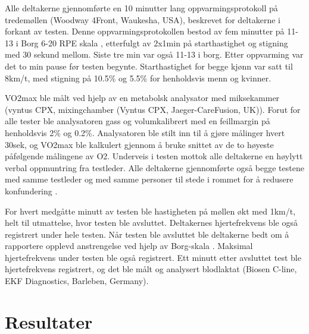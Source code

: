 \documentclass[
]{book}
\begin{document}
Alle deltakerne gjennomførte en 10 minutter lang oppvarmingsprotokoll på tredemøllen (Woodway 4Front, Waukesha, USA), beskrevet for deltakerne i forkant av testen. Denne oppvarmingsprotokollen bestod av fem minutter på 11-13 i Borg 6-20 RPE skala \citep{borg1982}, etterfulgt av 2x1min på starthastighet og stigning med 30 sekund mellom. Siste tre min var også 11-13 i borg. Etter oppvarming var det to min pause før testen begynte. Starthastighet for begge kjønn var satt til 8km/t, med stigning på 10.5\% og 5.5\% for henholdsvis menn og kvinner.

VO2max ble målt ved hjelp av en metabolsk analysator med miksekammer (vyntus CPX, mixing­chamber (Vyntus CPX, Jaeger-CareFusion, UK)). Forut for alle tester ble analysatoren gass og volumkalibrert med en feillmargin på henholdsvis 2\% og 0.2\%. Analysatoren ble stilt inn til å gjøre målinger hvert 30sek, og VO2max ble kalkulert gjennom å bruke snittet av de to høyeste påfølgende målingene av O2. Underveis i testen mottok alle deltakerne en høylytt verbal oppmuntring fra testleder. Alle deltakerne gjennomførte også begge testene med samme testleder og med samme personer til stede i rommet for å redusere konfundering \citep{halperin2015}.

For hvert medgåtte minutt av testen ble hastigheten på møllen økt med 1km/t, helt til utmattelse, hvor testen ble avsluttet. Deltakernes hjertefrekvens ble også registrert under hele testen. Når testen ble avsluttet ble deltakerne bedt om å rapportere opplevd anstrengelse ved hjelp av Borg-skala \citep{borg1982}. Maksimal hjertefrekvens under testen ble også registrert. Ett minutt etter avsluttet test ble hjertefrekvens registrert, og det ble målt og analysert blodlaktat (Biosen C-line, EKF Diagnostics, Barleben, Germany).

\hypertarget{resultater}{%
\section{Resultater}\label{resultater}}

\providecommand{\docline}[3]{\noalign{\global\setlength{\arrayrulewidth}{#1}}\arrayrulecolor[HTML]{#2}\cline{#3}}

\setlength{\tabcolsep}{2pt}

\renewcommand*{\arraystretch}{1.5}
\end{document}
